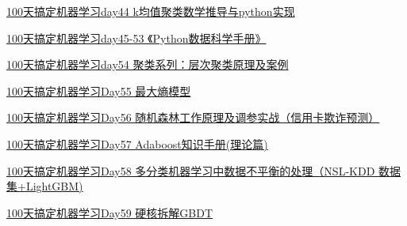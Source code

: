 \documentclass[
]{book}
\begin{document}
\href{http://mp.weixin.qq.com/s?__biz=MzA4MjYwMTc5Nw==\&mid=2648931441\&idx=3\&sn=609892ad8a7deffb5391beafff0726ae\&chksm=8794ee5bb0e3674d00c6576043baec14932f035b9ce3a526c608f5e8412aba2968dac4376a53\&scene=21\#wechat_redirect}{100天搞定机器学习\textbar day44 k均值聚类数学推导与python实现}

\href{http://mp.weixin.qq.com/s?__biz=MzA4MjYwMTc5Nw==\&mid=2648931441\&idx=4\&sn=19b0d91ba8ca7e09eb41ed3306536397\&chksm=8794ee5bb0e3674dd5282175be71a7a3e22f9da0515908fd34a1eb22a1474a29bb12119c2e04\&scene=21\#wechat_redirect}{100天搞定机器学习\textbar day45-53 《Python数据科学手册》}

\href{http://mp.weixin.qq.com/s?__biz=MzA4MjYwMTc5Nw==\&mid=2648931520\&idx=2\&sn=968cf54955bd0c56e696618af78a95f4\&chksm=8794eeeab0e367fc7539eb55c0183ad5f46420e0d857dccfe6daa205e247b98af6741ad1f5d2\&scene=21\#wechat_redirect}{100天搞定机器学习\textbar day54 聚类系列：层次聚类原理及案例}

\href{https://mp.weixin.qq.com/s?__biz=MzA4MjYwMTc5Nw==\&mid=2648932274\&idx=2\&sn=5ada70291cab3119e59b26d294f80a25\&chksm=8794ed98b0e3648eed6feea95ae55f00fb03110f4b77e29934554f38a0052caafb78ee877365\&token=1991487213\&lang=zh_CN\#rd}{100天搞定机器学习\textbar Day55 最大熵模型}

\href{https://mp.weixin.qq.com/s?__biz=MzA4MjYwMTc5Nw==\&mid=2648932334\&idx=2\&sn=4a99ae273f3f7d1928a6986658ec2fe8\&chksm=8794edc4b0e364d21a187a4ce487c2cf5587c648e143d3ec08105943f6e5c49be06b16f075d9\&token=1822684797\&lang=zh_CN\#rd}{100天搞定机器学习\textbar Day56 随机森林工作原理及调参实战（信用卡欺诈预测）}

\href{https://mp.weixin.qq.com/s?__biz=MzA4MjYwMTc5Nw==\&mid=2648932515\&idx=1\&sn=2ac90e1b53169c19140aca36bede4d70\&chksm=87941289b0e39b9f493f2e7b5e84ce0d943c3f3185949c0965f61f13991a63373ecc2d772184\&token=1141224323\&lang=zh_CN\#rd}{100天搞定机器学习\textbar Day57 Adaboost知识手册(理论篇)}

\href{https://mp.weixin.qq.com/s?__biz=MzA4MjYwMTc5Nw==\&mid=2648935326\&idx=1\&sn=beccf9c3000cf8e5557fb962c6b29160\&chksm=879419b4b0e390a2c6286e07b8c922f78d3265dc70aebfe827b977cd98d03bc159043b49ddad\&token=1141224323\&lang=zh_CN\#rd}{100天搞定机器学习\textbar Day58 多分类机器学习中数据不平衡的处理（NSL-KDD 数据集+LightGBM)}

\href{https://mp.weixin.qq.com/s?__biz=MzA4MjYwMTc5Nw==\&mid=2648937158\&idx=2\&sn=87232a58735a3fc900daf96b7189b49d\&chksm=879400ecb0e389fac1922db02b425c708b568ce4e1493ed6df2297c92723af7e5767e20b5026\&token=1141224323\&lang=zh_CN\#rd}{100天搞定机器学习\textbar Day59 硬核拆解GBDT}
\end{document}
